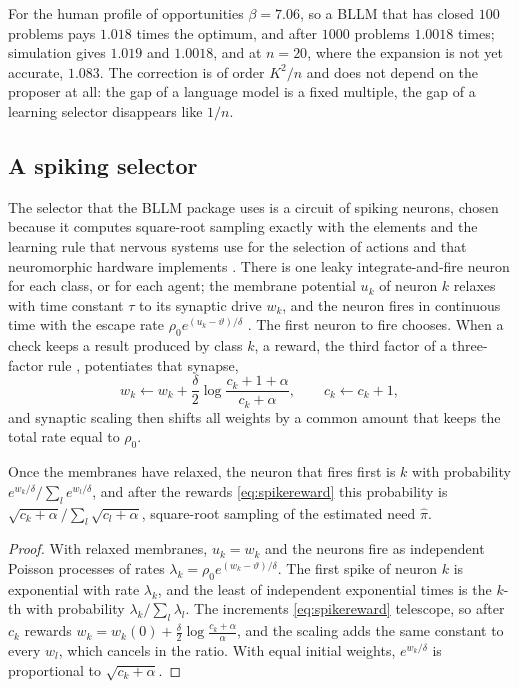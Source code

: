 For the human profile of opportunities $\beta=7.06$, so a BLLM that has closed $100$ problems pays $1.018$ times the optimum, and after $1000$ problems $1.0018$ times; simulation gives $1.019$ and $1.0018$, and at $n=20$, where the expansion is not yet accurate, $1.083$. The correction is of order $K^{2}/n$ and does not depend on the proposer at all: the gap of a language model is a fixed multiple, the gap of a learning selector disappears like $1/n$.

\subsection{A spiking selector}\label{ssec:selector}

The selector that the BLLM package uses is a circuit of spiking neurons, chosen because it computes square-root sampling exactly with the elements and the learning rule that nervous systems use for the selection of actions \cite{RPG99,SDM97,FG16} and that neuromorphic hardware implements \cite{Mea90,Maa97,DSL18}. There is one leaky integrate-and-fire neuron for each class, or for each agent; the membrane potential $u_{k}$ of neuron $k$ relaxes with time constant $\tau$ to its synaptic drive $w_{k}$, and the neuron fires in continuous time with the escape rate $\rho_{0}e^{(u_{k}-\vartheta)/\delta}$ \cite{GKN14}. The first neuron to fire chooses. When a check keeps a result produced by class $k$, a reward, the third factor of a three-factor rule \cite{FG16}, potentiates that synapse,
\begin{equation}\label{eq:spikereward}
w_{k}\leftarrow w_{k}+\frac\delta2\log\frac{c_{k}+1+\alpha}{c_{k}+\alpha},\qquad c_{k}\leftarrow c_{k}+1,
\end{equation}
and synaptic scaling \cite{TLD98} then shifts all weights by a common amount that keeps the total rate equal to $\rho_{0}$.

\begin{proposition}\label{prop:spiking}
Once the membranes have relaxed, the neuron that fires first is $k$ with probability $e^{w_{k}/\delta}/\sum_{l}e^{w_{l}/\delta}$, and after the rewards \eqref{eq:spikereward} this probability is $\sqrt{c_{k}+\alpha}/\sum_{l}\sqrt{c_{l}+\alpha}$, square-root sampling of the estimated need $\hat\pi$.
\end{proposition}

\begin{proof}
With relaxed membranes, $u_{k}=w_{k}$ and the neurons fire as independent Poisson processes of rates $\lambda_{k}=\rho_{0}e^{(w_{k}-\vartheta)/\delta}$. The first spike of neuron $k$ is exponential with rate $\lambda_{k}$, and the least of independent exponential times is the $k$-th with probability $\lambda_{k}/\sum_{l}\lambda_{l}$. The increments \eqref{eq:spikereward} telescope, so after $c_{k}$ rewards $w_{k}=w_{k}(0)+\frac\delta2\log\frac{c_{k}+\alpha}{\alpha}$, and the scaling adds the same constant to every $w_{l}$, which cancels in the ratio. With equal initial weights, $e^{w_{k}/\delta}$ is proportional to $\sqrt{c_{k}+\alpha}$.
\end{proof}

